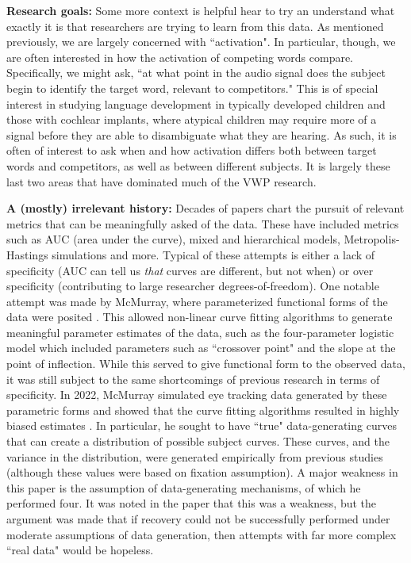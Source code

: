 \documentclass{article}
\begin{document}
\textbf{Research goals: } Some more context is helpful hear to try an understand what exactly it is that researchers are trying to learn from this data. As mentioned previously, we are largely concerned with ``activation". In particular, though, we are often interested in how the activation of competing words compare. Specifically, we might ask, ``at what point in the audio signal does the subject begin to identify the target word, relevant to competitors." This is of special interest in studying language development in typically developed children and those with cochlear implants, where atypical children may require more of a signal before they are able to disambiguate what they are hearing. As such, it is often of interest to ask when and how activation differs both between target words and competitors, as well as between different subjects. It is largely these last two areas that have dominated much of the VWP research.


\textbf{A (mostly) irrelevant history: } Decades of papers chart the pursuit of relevant metrics that can be meaningfully asked of the data. These have included metrics such as AUC (area under the curve), mixed and hierarchical models, Metropolis-Hastings simulations and more. Typical of these attempts is either a lack of specificity (AUC can tell us \textit{that} curves are different, but not when) or over specificity (contributing to large researcher degrees-of-freedom). One notable attempt was made by McMurray, where parameterized functional forms of the data were posited \cite{mcmurray2010individual}. This allowed non-linear curve fitting algorithms to generate meaningful parameter estimates of the data, such as the four-parameter logistic model which included parameters such as ``crossover point"
 and the slope at the point of inflection. While this served to give functional form to the observed data, it was still subject to the same shortcomings of previous research in terms of specificity. 
In 2022, McMurray simulated eye tracking data generated by these parametric forms and showed that the curve fitting algorithms resulted in highly biased estimates \cite{mcmurray2022m}. In particular, he sought to have ``true" data-generating curves that can create a distribution of possible subject curves. These curves, and the variance in the distribution, were generated empirically from previous studies (although these values were based on fixation assumption). A major weakness in this paper is the assumption of data-generating mechanisms, of which he performed four. It was noted in the paper that this was a weakness, but the argument was made that if recovery could not be successfully performed under moderate assumptions of data generation, then attempts with far more complex ``real data" would be hopeless. 
\end{document}
